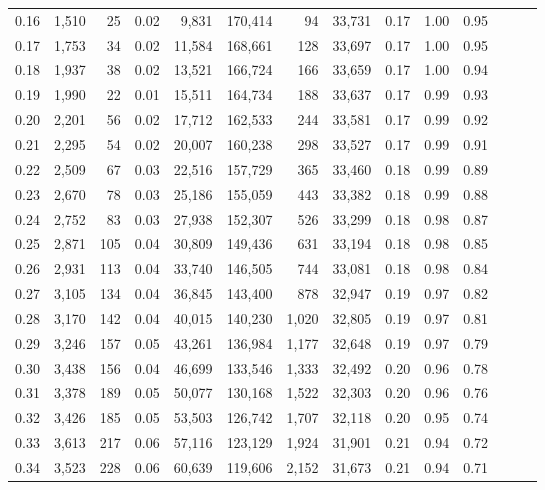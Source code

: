 \begin{tabular}{rrrrrrrrrrrrrr}
0.16 &  1,510 &   25 &  0.02 &    9,831 &  170,414 &      94 &  33,731 &  0.17 &  1.00 &      0.95 \\
0.17 &  1,753 &   34 &  0.02 &   11,584 &  168,661 &     128 &  33,697 &  0.17 &  1.00 &      0.95 \\
0.18 &  1,937 &   38 &  0.02 &   13,521 &  166,724 &     166 &  33,659 &  0.17 &  1.00 &      0.94 \\
0.19 &  1,990 &   22 &  0.01 &   15,511 &  164,734 &     188 &  33,637 &  0.17 &  0.99 &      0.93 \\
0.20 &  2,201 &   56 &  0.02 &   17,712 &  162,533 &     244 &  33,581 &  0.17 &  0.99 &      0.92 \\
0.21 &  2,295 &   54 &  0.02 &   20,007 &  160,238 &     298 &  33,527 &  0.17 &  0.99 &      0.91 \\
0.22 &  2,509 &   67 &  0.03 &   22,516 &  157,729 &     365 &  33,460 &  0.18 &  0.99 &      0.89 \\
0.23 &  2,670 &   78 &  0.03 &   25,186 &  155,059 &     443 &  33,382 &  0.18 &  0.99 &      0.88 \\
0.24 &  2,752 &   83 &  0.03 &   27,938 &  152,307 &     526 &  33,299 &  0.18 &  0.98 &      0.87 \\
0.25 &  2,871 &  105 &  0.04 &   30,809 &  149,436 &     631 &  33,194 &  0.18 &  0.98 &      0.85 \\
0.26 &  2,931 &  113 &  0.04 &   33,740 &  146,505 &     744 &  33,081 &  0.18 &  0.98 &      0.84 \\
0.27 &  3,105 &  134 &  0.04 &   36,845 &  143,400 &     878 &  32,947 &  0.19 &  0.97 &      0.82 \\
0.28 &  3,170 &  142 &  0.04 &   40,015 &  140,230 &   1,020 &  32,805 &  0.19 &  0.97 &      0.81 \\
0.29 &  3,246 &  157 &  0.05 &   43,261 &  136,984 &   1,177 &  32,648 &  0.19 &  0.97 &      0.79 \\
0.30 &  3,438 &  156 &  0.04 &   46,699 &  133,546 &   1,333 &  32,492 &  0.20 &  0.96 &      0.78 \\
0.31 &  3,378 &  189 &  0.05 &   50,077 &  130,168 &   1,522 &  32,303 &  0.20 &  0.96 &      0.76 \\
0.32 &  3,426 &  185 &  0.05 &   53,503 &  126,742 &   1,707 &  32,118 &  0.20 &  0.95 &      0.74 \\
0.33 &  3,613 &  217 &  0.06 &   57,116 &  123,129 &   1,924 &  31,901 &  0.21 &  0.94 &      0.72 \\
0.34 &  3,523 &  228 &  0.06 &   60,639 &  119,606 &   2,152 &  31,673 &  0.21 &  0.94 &      0.71 \\

\end{tabular}
